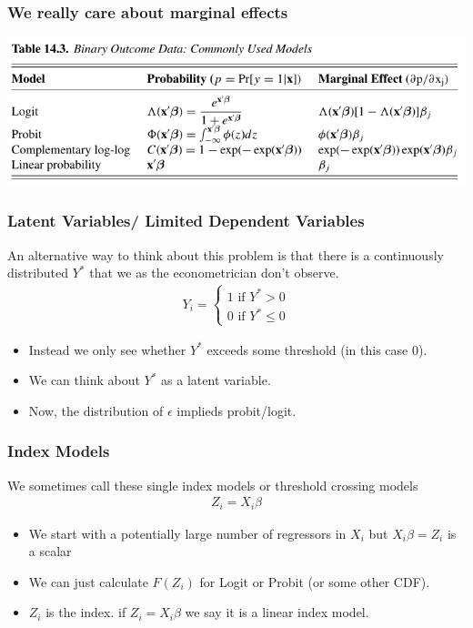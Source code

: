\documentclass[11pt,dvipsnames,table,aspectratio=169]{beamer}
\begin{document}
\begin{frame}
       \frametitle{We really care about marginal effects}
       \begin{center}
       \includegraphics[width=\textwidth]{resources/CTmarginals}
       \end{center}
\end{frame}

\begin{frame}
       \frametitle{Latent Variables/ Limited Dependent Variables}
       An alternative way to think about this problem is that there is a continuously distributed $Y^{*}$ that we as the econometrician don't observe.
       \begin{eqnarray*}
       Y_i =
       \begin{cases}
       1 \mbox{ if } Y^{*} >0 \\
       0 \mbox{ if } Y^{*} \leq 0
       \end{cases}
       \end{eqnarray*}
       \begin{itemize}
       \item Instead we only see whether $Y^{*}$ exceeds some threshold (in this case $0$).
       \item We can think about $Y^{*}$ as a \alert{latent variable}.
       \item Now, the distribution of $\epsilon$ implieds probit/logit. 
       \end{itemize}
\end{frame}
       
       
\begin{frame}
       \frametitle{Index Models}
       We sometimes call these single index models or threshold crossing models
       \begin{eqnarray*}
       Z_i = X_i \beta
       \end{eqnarray*}
       \begin{itemize}
       \item We start with a potentially large number of regressors in $X_i$ but $X_i \beta = Z_i$ is a \alert{scalar}
       \item We can just calculate $F(Z_i)$ for Logit or Probit (or some other CDF).
       \item $Z_i$ is the \alert{index}. if $Z_i = X_i \beta$ we say it is a \alert{linear index} model.
       \end{itemize}
\end{frame}
\end{document}
